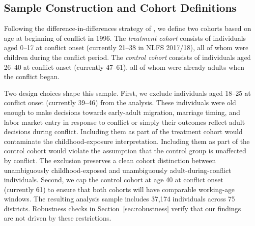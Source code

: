 
\subsection{Sample Construction and Cohort Definitions}

Following the difference-in-differences strategy of \cite{10.1257/aer.91.4.795}, we define two cohorts based on age at beginning of conflict in 1996. The \emph{treatment cohort} consists of individuals aged 0--17 at conflict onset (currently 21--38 in NLFS 2017/18), all of whom were children during the conflict period. The \emph{control cohort} consists of individuals aged 26--40 at conflict onset (currently 47--61), all of whom were already adults when the conflict began.




Two design choices shape this sample. First, we exclude individuals aged 18--25 at conflict onset (currently 39--46) from the analysis. These individuals were old enough to make decisions towards early-adult migration, marriage timing, and labor market entry in response to conflict or simply their outcomes reflect adult decisions during conflict. Including them as part of the treatment cohort would contaminate the childhood-exposure interpretation.  Including them as part of the control cohort would violate the assumption that the control group is unaffected by conflict. The exclusion preserves a clean cohort distinction between unambiguously childhood-exposed and unambiguously adult-during-conflict individuals. Second, we cap the control cohort at age 40 at conflict onset (currently 61) to ensure that both cohorts will have comparable working-age windows. The resulting analysis sample includes 37,174 individuals across 75 districts. Robustness checks in Section~\ref{sec:robustness} verify that our findings are not driven by these restrictions.



